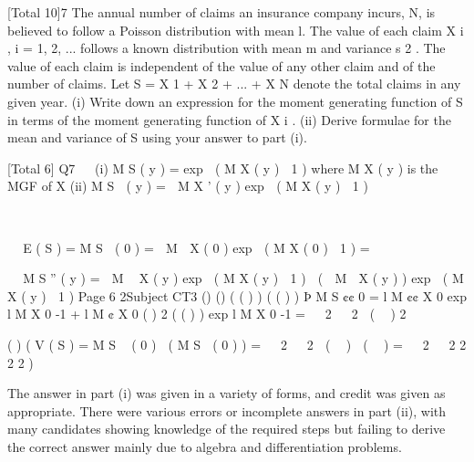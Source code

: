 \documentclass[a4paper,12pt]{article}
\begin{document}
[Total 10]7
The annual number of claims an insurance company incurs, N, is believed to follow
a Poisson distribution with mean l. The value of each claim X i , i = 1, 2, ... follows
a known distribution with mean m and variance s 2 . The value of each claim is
independent of the value of any other claim and of the number of claims. Let
S = X 1 + X 2 + ... + X N denote the total claims in any given year.
(i)
Write down an expression for the moment generating function of S in terms of
the moment generating function of X i .
(ii)
Derive formulae for the mean and variance of S using your answer to part (i).


[Total 6]
Q7


(i) M S ( y ) \;=\; exp  ( M X ( y )  1 ) where M X ( y ) is the MGF of X
(ii) M S  ( y ) \;=\;  M X ' ( y ) exp  ( M X ( y )  1 )






 E ( S ) \;=\; M S  ( 0 ) \;=\;  M  X ( 0 ) exp  ( M X ( 0 )  1 ) \;=\; 





M S '' ( y ) \;=\;  M  X ( y ) exp  ( M X ( y )  1 )  (  M  X ( y ) ) exp  ( M X ( y )  1 ) 
Page 6
2Subject CT3 %
()
() { (
( ) ) } (
( ) )
Þ M S ¢¢ 0 = l M ¢¢ X 0 exp l M X 0 -1 + l M ¢ X 0
(
)
2
{ ( ( ) ) }
exp l M X 0 -1
\;=\;   2   2  (  )
2

(
)
(
V ( S ) \;=\; M S  ( 0 )  ( M S  ( 0 ) ) \;=\;   2   2  (  )  (  ) \;=\;   2   2
2
2
2
)

The answer in part (i) was given in a variety of forms, and credit was
given as appropriate. There were various errors or incomplete answers
in part (ii), with many candidates showing knowledge of the required
steps but failing to derive the correct answer mainly due to algebra and
differentiation problems.
\end{document}
